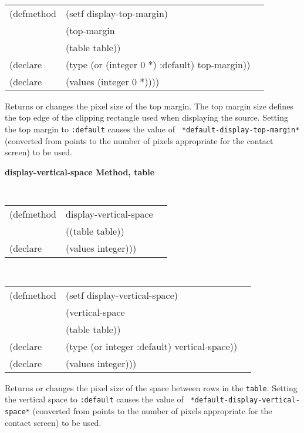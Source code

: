 \begin{flushright} \parbox[t]{6.125in}{
\tt
\begin{tabular}{lll}
\raggedright
(defmethod & (setf display-top-margin) & \\
         & (top-margin \\
         & (table  table)) \\
(declare &(type (or (integer 0 *) :default)  top-margin))\\
(declare & (values (integer 0 *))))
\end{tabular}
\rm}
\end{flushright}

\begin{flushright} \parbox[t]{6.125in}{
Returns or changes the pixel size of the
top margin.  The top margin size defines
the top edge of the clipping rectangle used when displaying the source.
Setting the top margin to {\tt :default} causes the value of {\tt
*default-display-top-margin*} (converted from points to the number of pixels
appropriate for the contact screen) to be used.
}
\end{flushright}
	  

{\samepage
{\large {\bf display-vertical-space \hfill Method, table}}
\begin{flushright} \parbox[t]{6.125in}{
\tt
\begin{tabular}{lll}
\raggedright
(defmethod & display-vertical-space & \\
& ((table  table)) \\
(declare & (values integer)))
\end{tabular}
\rm}\end{flushright}}

\begin{flushright} \parbox[t]{6.125in}{
\tt
\begin{tabular}{lll}
\raggedright
(defmethod & (setf display-vertical-space) & \\
& (vertical-space \\
& (table  table)) \\
(declare &(type (or integer :default)  vertical-space))\\
(declare & (values integer)))
\end{tabular}
\rm}\end{flushright}

\begin{flushright} \parbox[t]{6.125in}{ 
Returns or changes the pixel size of the space between rows in the {\tt table}.  
Setting the vertical space to {\tt :default} causes the value of {\tt
*default-display-vertical-space*} (converted from points to the number of pixels
appropriate for the contact screen) to be used.
  
}\end{flushright}



